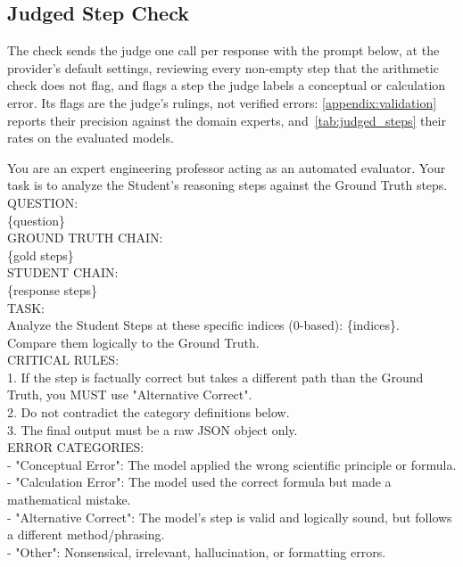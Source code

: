 \subsection{Judged Step Check}

The check sends the judge one call per response with the prompt below, at the provider's default
settings, reviewing every non-empty step that the arithmetic check does not flag, and flags a step
the judge labels a conceptual or calculation error.
Its flags are the judge's rulings, not verified errors: \autoref{appendix:validation} reports their
precision against the domain experts, and~\autoref{tab:judged_steps} their rates on the evaluated
models.

\begin{tcolorbox}[
    colback=gray!5,
    colframe=gray!40,
    boxrule=0.4pt,
    arc=2pt,
    left=6pt,
    right=6pt,
    top=6pt,
    bottom=6pt,
    breakable
]
\footnotesize
\ttfamily
You are an expert engineering professor acting as an automated evaluator.
Your task is to analyze the Student's reasoning steps against the Ground Truth steps. \\

QUESTION: \\
\{question\} \\

GROUND TRUTH CHAIN: \\
\{gold steps\} \\

STUDENT CHAIN: \\
\{response steps\} \\

TASK: \\
Analyze the Student Steps at these specific indices (0-based): \{indices\}. \\
Compare them logically to the Ground Truth. \\

CRITICAL RULES: \\
1. If the step is factually correct but takes a different path than the Ground Truth, you MUST use
"Alternative Correct". \\
2. Do not contradict the category definitions below. \\
3. The final output must be a raw JSON object only. \\

ERROR CATEGORIES: \\
- "Conceptual Error": The model applied the wrong scientific principle or formula. \\
- "Calculation Error": The model used the correct formula but made a mathematical mistake. \\
- "Alternative Correct": The model's step is valid and logically sound, but follows a different
method/phrasing. \\
- "Other": Nonsensical, irrelevant, hallucination, or formatting errors. \\


\end{tcolorbox}
